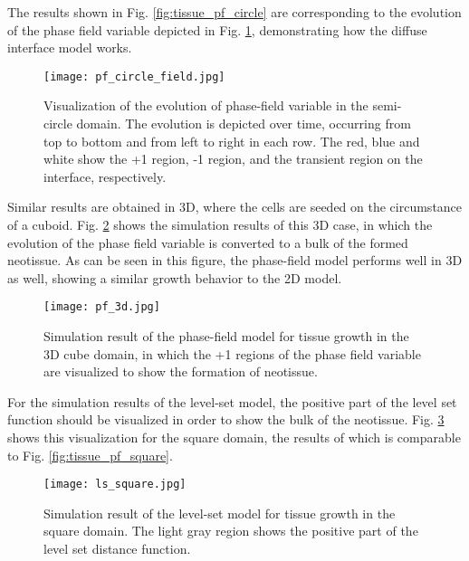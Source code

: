 The results shown in Fig. \ref{fig:tissue_pf_circle} are corresponding to the evolution of the phase field variable depicted in Fig. \ref{fig:tissue_pf_circle_field}, demonstrating how the diffuse interface model works. 


\begin{figure}
\medskip
\centering
\texttt{[image: pf\_circle\_field.jpg]}
\caption[Visualization of the evolution of phase-field variable in the semi-circle domain]{Visualization of the evolution of phase-field variable in the semi-circle domain. The evolution is depicted over time, occurring from top to bottom and from left to right in each row. The red, blue and white show the +1 region, -1 region, and the transient region on the interface, respectively.}
\label{fig:tissue_pf_circle_field}
\end{figure}

Similar results are obtained in 3D, where the cells are seeded on the circumstance of a cuboid. Fig. \ref{fig:tissue_pf_3d} shows the simulation results of this 3D case, in which the evolution of the phase field variable is converted to a bulk of the formed neotissue. As can be seen in this figure, the phase-field model performs well in 3D as well, showing a similar growth behavior to the 2D model.

\begin{figure}
\medskip
\centering
\texttt{[image: pf\_3d.jpg]}
\caption[Simulation result of the phase-field model for tissue growth in the 3D cube domain]{Simulation result of the phase-field model for tissue growth in the 3D cube domain, in which the +1 regions of the phase field variable are visualized to show the formation of neotissue.}
\label{fig:tissue_pf_3d}
\end{figure}


For the simulation results of the level-set model, the positive part of the level set function should be visualized in order to show the bulk of the neotissue. Fig. \ref{fig:tissue_ls_square} shows this visualization for the square domain, the results of which is comparable to Fig. \ref{fig:tissue_pf_square}. 


\begin{figure}
\medskip
\centering
\texttt{[image: ls\_square.jpg]}
\caption[Simulation result of the level-set model for tissue growth in the square domain]{Simulation result of the level-set model for tissue growth in the square domain. The light gray region shows the positive part of the level set distance function.}
\label{fig:tissue_ls_square}
\end{figure}

